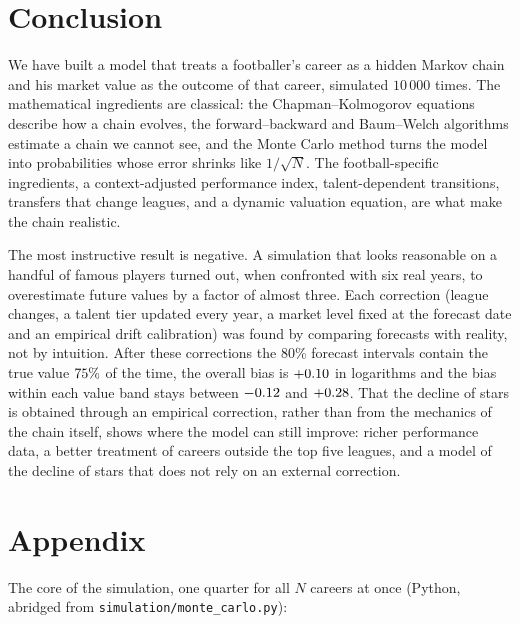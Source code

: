 \documentclass[11pt]{amsart}
\theoremstyle{definition}
\theoremstyle{remark}
\begin{document}
\section{Conclusion}\label{sec:conclusion}

We have built a model that treats a footballer's career as a hidden Markov chain and his market value as the outcome of that career, simulated $10\,000$ times. The mathematical ingredients are classical: the Chapman--Kolmogorov equations describe how a chain evolves, the forward--backward and Baum--Welch algorithms estimate a chain we cannot see, and the Monte Carlo method turns the model into probabilities whose error shrinks like $1/\sqrt N$. The football-specific ingredients, a context-adjusted performance index, talent-dependent transitions, transfers that change leagues, and a dynamic valuation equation, are what make the chain realistic.

The most instructive result is negative. A simulation that looks reasonable on a handful of famous players turned out, when confronted with six real years, to overestimate future values by a factor of almost three. Each correction (league changes, a talent tier updated every year, a market level fixed at the forecast date and an empirical drift calibration) was found by comparing forecasts with reality, not by intuition. After these corrections the 80\% forecast intervals contain the true value $75\%$ of the time, the overall bias is $+0.10$ in logarithms and the bias within each value band stays between $-0.12$ and $+0.28$. That the decline of stars is obtained through an empirical correction, rather than from the mechanics of the chain itself, shows where the model can still improve: richer performance data, a better treatment of careers outside the top five leagues, and a model of the decline of stars that does not rely on an external correction.

\section{Appendix}
The core of the simulation, one quarter for all $N$ careers at once (Python, abridged from \texttt{simulation/monte\_carlo.py}):
\end{document}
